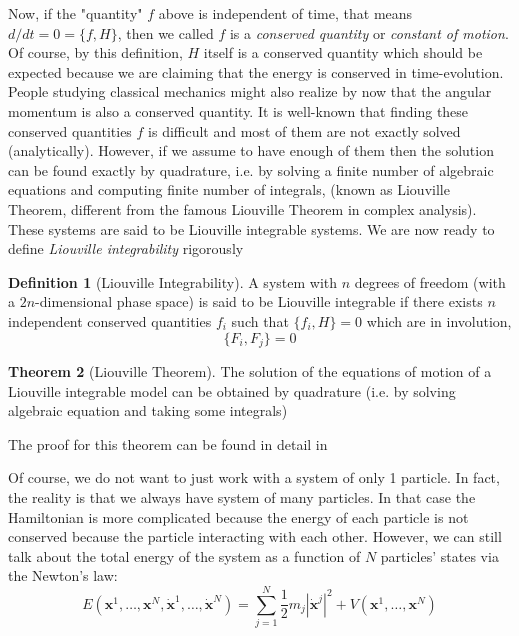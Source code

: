 \documentclass[]{article}
\theoremstyle{definition}
\newtheorem{theorem}{Theorem}[section]
\newtheorem{definition}[theorem]{Definition}
\begin{document}
	Now, if the "quantity" $f$ above is independent of time, that means $d/dt=0=\{f,H\}$, then we called $f$ is a \emph{conserved quantity} or \emph{constant of motion}. Of course, by this definition, $H$ itself is a conserved quantity which should be expected because we are claiming that the energy is conserved in time-evolution. People studying classical mechanics might also realize by now that the angular momentum is also a conserved quantity. It is well-known that finding these conserved quantities $f$ is difficult and most of them are not exactly solved (analytically). However, if we assume to  have enough of them then the solution can be found exactly by quadrature, i.e. by solving a finite number of algebraic equations and computing finite number of integrals, (known as Liouville Theorem, different from the famous Liouville Theorem in complex analysis). These systems are said to be Liouville integrable systems. We are now ready to define \emph{Liouville integrability} rigorously
	

	\begin{definition}[Liouville Integrability]
		A system with $n$ degrees of freedom (with a $2n$-dimensional phase space) is said to be Liouville integrable if there exists $n$ independent conserved quantities $f_i$ such that $\{f_i,H\}=0$ which are in involution, 
		\begin{equation}
			\{F_i,F_j\}=0
		\end{equation}
	\end{definition}

	\begin{theorem}[Liouville Theorem]
		The solution of the equations of motion of a Liouville integrable model can be obtained by quadrature (i.e. by solving algebraic equation and taking some integrals)
	\end{theorem}

	The proof for this theorem can be found in detail in \cite{babelon_bernard_talon_2003}
	
	Of course, we do not want to just work with a system of only 1 particle. In fact, the reality is that we always have system of many particles. In that case the Hamiltonian is  more complicated because the energy of each particle is not conserved because the particle interacting with each other. However, we can still talk about the total energy of the system as a function of $N$ particles' states via the Newton's law: 
	$$E(\textbf{x}^1, \dots, \textbf{x}^N, \dot{\textbf{x}}^1, \dots, \dot{\textbf{x}}^N)
	=\sum_{j=1}^N\frac{1}{2}m_j |\dot{\textbf{x}}^j|^2 + V(\textbf{x}^1, \dots, \textbf{x}^N) $$
	 
\end{document}
